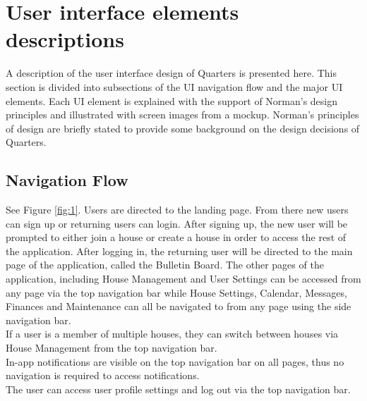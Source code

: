 \documentclass[12pt]{article}
\begin{document}
\section{User interface elements descriptions}
A description of the user interface design of Quarters is presented here. This section is divided into subsections of the UI navigation flow and the major UI elements. Each UI element is explained with the support of Norman's design principles and illustrated with screen images from a mockup. Norman's principles of design are briefly stated to provide some background on the design decisions of Quarters.

\subsection{Navigation Flow}
See Figure \ref{fig:1}. Users are directed to the landing page. From there new users can sign up or returning users can login. After signing up, the new user will be prompted to either join a house or create a house in order to access the rest of the application. After logging in, the returning user will be directed to the main page of the application, called the Bulletin Board. The other pages of the application, including House Management and User Settings can be accessed from any page via the top navigation bar while House Settings, Calendar, Messages, Finances and Maintenance can all be navigated to from any page using the side navigation bar.\\

\noindent If a user is a member of multiple houses, they can switch between houses via House Management from the top navigation bar. \\

\noindent In-app notifications are visible on the top navigation bar on all pages, thus no navigation is required to access notifications. \\

\noindent The user can access user profile settings and log out via the top navigation bar.
\end{document}
